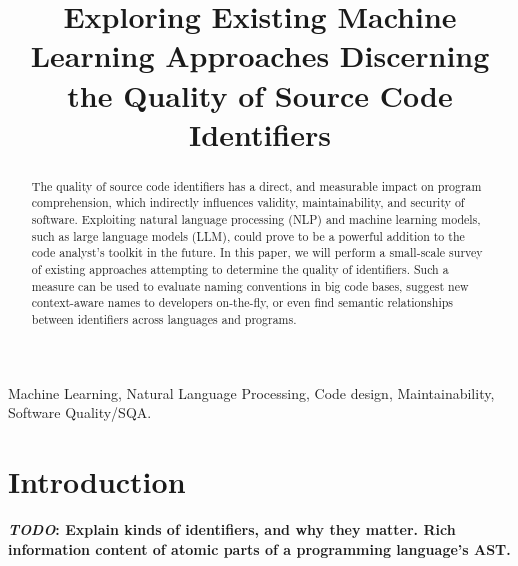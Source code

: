 \documentclass[conference]{IEEEtran}
\newcommand{\TODO}[1]{\textbf{\textcolor{Bittersweet}{#1}}\xspace}
\newcommand{\TODOM}[1]{\TODO{\emph{TODO}: #1}\xspace}
\begin{document}
\title{Exploring Existing Machine Learning Approaches Discerning the Quality of Source
Code Identifiers}

\author{
\and
{}
}

\maketitle

\begin{abstract}
    The quality of source code identifiers has a direct, and measurable impact on program
    comprehension, which indirectly influences validity, maintainability, and security of
    software. Exploiting natural language processing (NLP) and machine learning models,
    such as large language models (LLM), could prove to be a powerful addition to the code
    analyst's toolkit in the future. In this paper, we will perform a small-scale survey
    of existing approaches attempting to determine the quality of identifiers. Such a
    measure can be used to evaluate naming conventions in big code bases, suggest new
    context-aware names to developers on-the-fly, or even find semantic relationships
    between identifiers across languages and programs.
\end{abstract}

\begin{IEEEkeywords}
Machine Learning, Natural Language Processing, Code design, Maintainability, Software
Quality/SQA.
\end{IEEEkeywords}

\section{Introduction}
\label{sec:Introduction}

\TODOM{Explain kinds of identifiers, and why they matter. Rich information content of
atomic parts of a programming language's AST.}
\end{document}
